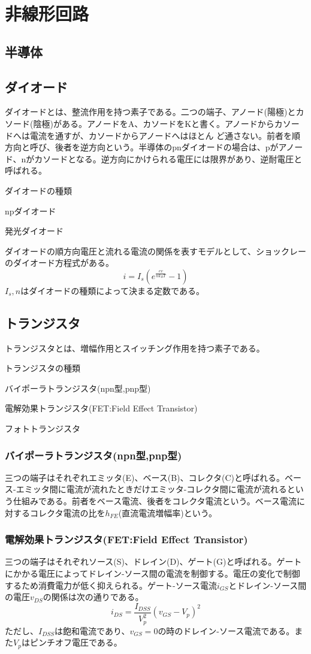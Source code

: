 \section{非線形回路}

\subsection{半導体}
\subsection{ダイオード}
    ダイオードとは、整流作用を持つ素子である。二つの端子、アノード(陽極)とカソード(陰極)がある。アノードをA、カソードをKと書く。アノードからカソードへは電流を通すが、カソードからアノードへはほとん
    ど通さない。前者を順方向と呼び、後者を逆方向という。半導体のpnダイオードの場合は、pがアノード、nがカソードとなる。逆方向にかけられる電圧には限界があり、逆耐電圧と呼ばれる。

    ダイオードの種類
    \begin{enumrate}
        \item npダイオード
        \item 発光ダイオード
    \end{enumrate}
    ダイオードの順方向電圧と流れる電流の関係を表すモデルとして、ショックレーのダイオード方程式がある。
        \[i = I_s(e^{\frac{ev}{nk_BT}}-1)\]
    $I_s,n$はダイオードの種類によって決まる定数である。
\subsection{トランジスタ}
    トランジスタとは、増幅作用とスイッチング作用を持つ素子である。

    トランジスタの種類
    \begin{enumrate}
        \item バイポーラトランジスタ(npn型,pnp型)
        \item 電解効果トランジスタ(FET:Field Effect Transistor)
        \item フォトトランジスタ
    \end{enumrate}
    \subsubsection{バイポーラトランジスタ(npn型,pnp型)}
        三つの端子はそれぞれエミッタ(E)、ベース(B)、コレクタ(C)と呼ばれる。ベース-エミッタ間に電流が流れたときだけエミッタ-コレクタ間に電流が流れるという仕組みである。前者をベース電流、後者をコレクタ電流という。ベース電流に対するコレクタ電流の比を$h_{FE}$(直流電流増幅率)という。
    \subsubsection{電解効果トランジスタ(FET:Field Effect Transistor)}
        三つの端子はそれぞれソース(S)、ドレイン(D)、ゲート(G)と呼ばれる。ゲートにかかる電圧によってドレイン-ソース間の電流を制御する。電圧の変化で制御するため消費電力が低く抑えられる。ゲート-ソース電流$i_{GS}$とドレイン-ソース間の電圧$v_{DS}$の関係は次の通りである。
            \[i_{DS} = \frac{I_{DSS}}{V_p^2}(v_{GS}-V_p)^2\]
        ただし、$I_{DSS}$は飽和電流であり、$v_{GS}=0$の時のドレイン-ソース電流である。また$V_p$はピンチオフ電圧である。